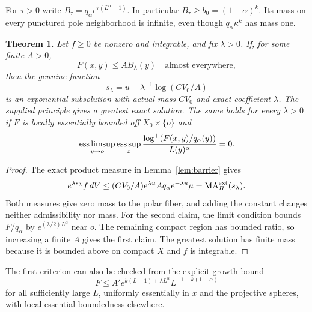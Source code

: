\documentclass[11pt]{article}
\newcommand{\MA}{\operatorname{MA}}
\newtheorem{theorem}{Theorem}
\theoremstyle{remark}\newtheorem{remark}[theorem]{Remark}
\begin{document}
For $\tau>0$ write $B_\tau=q_\alpha e^{\tau(L^\alpha-1)}$.
In particular $B_\tau\geq b_0=(1-\alpha)^k$.
Its mass on every punctured pole neighborhood is infinite, even
though $q_\alpha\kappa^k$ has mass one.

\begin{theorem}\label{th:criterion}
Let $f\geq0$ be nonzero and integrable, and fix $\lambda>0$.
If, for some finite $A>0$,
\[
 F(x,y)\leq A B_\lambda(y)\quad\text{almost everywhere},
\]
then the genuine function
\[
 s_\lambda=u+\lambda^{-1}\log(CV_0/A)
\]
is an exponential subsolution with actual mass $CV_0$ and exact
coefficient $\lambda$. The supplied principle gives a greatest exact
solution. The same holds for every $\lambda>0$ if $F$ is locally
essentially bounded off $X_0\times\{o\}$ and
\[
 \mathop{\rm ess\,limsup}_{y\to o}\mathop{\rm ess\,sup}_{x}
    \frac{\log^+(F(x,y)/q_\alpha(y))}{L(y)^\alpha}=0.
\]
\end{theorem}
\begin{proof}
The exact product measure in Lemma~\ref{lem:barrier} gives
\[
 e^{\lambda s_\lambda}f\,dV
 \leq(CV_0/A)e^{\lambda u}Aq_\alpha e^{-\lambda u}\mu
 =\MA_H^{\rm ext}(s_\lambda).
\]
Both measures give zero mass to the polar fiber, and adding the
constant changes neither admissibility nor mass. For the second
claim, the limit condition bounds $F/q_\alpha$ by
$e^{(\lambda/2)L^\alpha}$ near $o$. The remaining compact region
has bounded ratio, so increasing a finite $A$ gives the first claim.
The greatest solution has finite mass because it is bounded above
on compact $X$ and $f$ is integrable.
\end{proof}

The first criterion can also be checked from the explicit growth bound
\[
 F\leq A'e^{k(L-1)+\lambda L^\alpha}L^{-1-k(1-\alpha)}
\]
for all sufficiently large $L$, uniformly essentially in $x$ and
the projective spheres, with local essential boundedness elsewhere.
\end{document}
